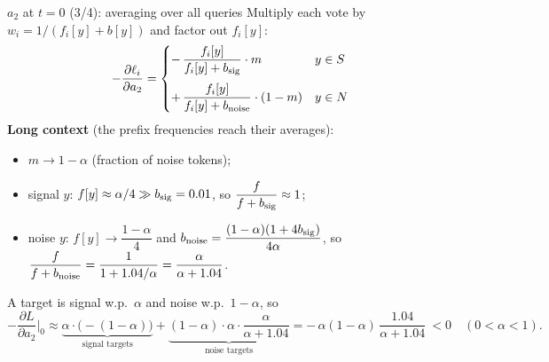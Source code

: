 \documentclass[aspectratio=169,11pt]{beamer}
\newcommand{\1}{\mathbf{1}}
\begin{document}
\begin{frame}{$a_2$ at $t=0$ (3/4): averaging over all queries}
\footnotesize\setlength{\abovedisplayskip}{3pt}\setlength{\belowdisplayskip}{3pt}
Multiply each vote by $w_i=1/(f_i[y]+b[y])$ and factor out $f_i[y]$:
\[
-\frac{\partial\ell_i}{\partial a_2}=
\begin{cases}
-\,\dfrac{f_i[y]}{f_i[y]+b_{\rm sig}}\cdot m & y\in S\\[1.2em]
+\,\dfrac{f_i[y]}{f_i[y]+b_{\rm noise}}\cdot(1-m) & y\in N
\end{cases}
\]
\textbf{Long context} (the prefix frequencies reach their averages):
\begin{itemize}
\item $m\to1-\alpha$ (fraction of noise tokens);
\item signal $y$: $f[y]\approx\alpha/4\gg b_{\rm sig}=0.01$, so $\dfrac{f}{f+b_{\rm sig}}\approx1$;
\item noise $y$: $f[y]\to\dfrac{1-\alpha}4$ and $b_{\rm noise}=\dfrac{(1-\alpha)(1+4b_{\rm sig})}{4\alpha}$, so
$\dfrac{f}{f+b_{\rm noise}}=\dfrac{1}{1+1.04/\alpha}=\dfrac{\alpha}{\alpha+1.04}$.
\end{itemize}
A target is signal w.p.\ $\alpha$ and noise w.p.\ $1-\alpha$, so
\[
-\frac{\partial L}{\partial a_2}\Big|_0\approx
\underbrace{\alpha\cdot\big(-(1-\alpha)\big)}_{\text{signal targets}}
+\underbrace{(1-\alpha)\cdot\alpha\cdot\frac{\alpha}{\alpha+1.04}}_{\text{noise targets}}
=-\,\alpha(1-\alpha)\,\frac{1.04}{\alpha+1.04}\ <0\quad(0<\alpha<1).
\]
\end{frame}
\end{document}
